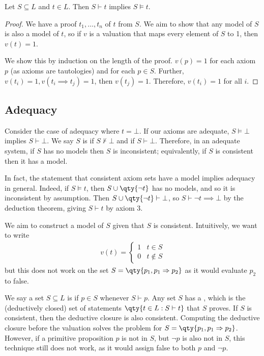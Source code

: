 \begin{proposition}
    Let $S \subseteq L$ and $t \in L$.
    Then $S \vdash t$ implies $S \models t$.
\end{proposition}

\begin{proof}
    We have a proof $t_1, \dots, t_n$ of $t$ from $S$.
    We aim to show that any model of $S$ is also a model of $t$, so if $v$ is a valuation that maps every element of $S$ to 1, then $v(t) = 1$.

    We show this by induction on the length of the proof.
    $v(p) = 1$ for each axiom $p$ (as axioms are tautologies) and for each $p \in S$.
    Further, $v(t_i) = 1, v(t_i \implies t_j) = 1$, then $v(t_j) = 1$.
    Therefore, $v(t_i) = 1$ for all $i$.
\end{proof}

\subsection{Adequacy}
Consider the case of adequacy where $t = \bot$.
If our axioms are adequate, $S \models \bot$ implies $S \vdash \bot$.
We say $S$ is  if $S \not\vdash \bot$ and  if $S \vdash \bot$.
Therefore, in an adequate system, if $S$ has no models then $S$ is inconsistent; equivalently, if $S$ is consistent then it has a model.

In fact, the statement that consistent axiom sets have a model implies adequacy in general.
Indeed, if $S \models t$, then $S \cup \qty{\neg t}$ has no models, and so it is inconsistent by assumption.
Then $S \cup \qty{\neg t} \vdash \bot$, so $S \vdash \neg t \implies \bot$ by the deduction theorem, giving $S \vdash t$ by axiom 3.

We aim to construct a model of $S$ given that $S$ is consistent.
Intuitively, we want to write
\begin{align*}
v(t) = \begin{cases}
    1 & t \in S \\
    0 & t \not\in S
\end{cases}
\end{align*}
but this does not work on the set $S = \qty{p_1, p_1 \implies p_2}$ as it would evaluate $p_2$ to false.

We say a set $S \subseteq L$ is  if $p \in S$ whenever $S \vdash p$.
Any set $S$ has a , which is the (deductively closed) set of statements $\qty{t \in L : S \vdash t}$ that $S$ proves.
If $S$ is consistent, then the deductive closure is also consistent.
Computing the deductive closure before the valuation solves the problem for $S = \qty{p_1, p_1 \implies p_2}$.
However, if a primitive proposition $p$ is not in $S$, but $\neg p$ is also not in $S$, this technique still does not work, as it would assign false to both $p$ and $\neg p$.

